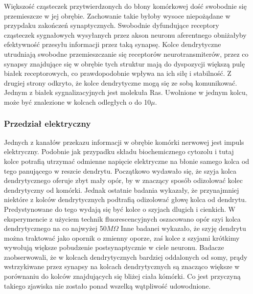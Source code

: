\documentclass{article}
\begin{document}
Większość cząsteczek przytwierdzonych do błony komórkowej dość swobodnie się przemieszcze w jej obrębie. 
Zachowanie takie byłoby wysoce niepożądane w przypdaku zakończeń synaptycznych. 
Swobodnie dyfundujące receptory cząsteczek sygnałowych wysyłanych przez akson neuronu aferentnego obniżałyby efektywność przesyłu informacji przez taką synapsę. 
Kolce dendrytyczne utrudniają swobodne przemieszczanie się receptorów neurotransmiterów, przez co synapsy znajdujące się w obrębie tych struktur mają do dyspozycji większą pulę białek receptorowych, co prawdopodobnie wpływa na ich siłę i stabilność.
Z drugiej strony odkryto, że kolce dendrytyczne mogą się ze sobą komunikować.
Jednym z białek sygnalizacyjnych jest molekuła Ras.
Uwolnione w jednym kolcu, może być znalezione w kolcach odległych o do 10\(\mu\).

\subsubsection{Przedział elektryczny}
Jednych z kanałów przekazu informacji w obrębie komórki nerwowej jest impuls elektryczny.
Podobnie jak przypadku składu biochemicznego cytozolu i tutaj kolce potrafią utrzymać odmienne napięcie elektryczne na błonie samego kolca od tego panującego w reszcie dendrytu.
Początkowo wydawało się, że szyja kolca dendrytycznego oferuje zbyt mały opór, by w znaczący sposób odizolować kolec dendrytyczny od komórki. 
Jednak ostatnie badania wykazały, że przynajmniej niektóre z kolców dendrytycznych podtrafią odizolować głowę kolca od dendrytu.
Predystynowane do tego wydają się być kolce o szyjach dlugich i cienkich.
W eksperymencie z użyciem technik fluorescencyjnych oszacowano opór szyi kolca dendrytycznego na co najwyżej 50\(M\Omega\)
Inne badanei wykazało, że szyję dendrytu można traktować jako opornik o zmienny oporze, zaś kolce z szyjami krótkimy wywołują większe pobudzenie postsynaptycznie w ciele neuronu.
Badacze zaobserwowali, że w kolcach dendrytycznych bardziej oddalonych od somy, prądy wstrzykiwane przez synapsy na kolcach dendrytycznych są znacząco większe w porównaniu do kolców znajdujących się bliżej ciała kómórki.
Co jest przyczyną takiego zjawiska nie zostało ponad wszelką wątpliwość udowodnione\citep{Sala2014}.
\end{document}

